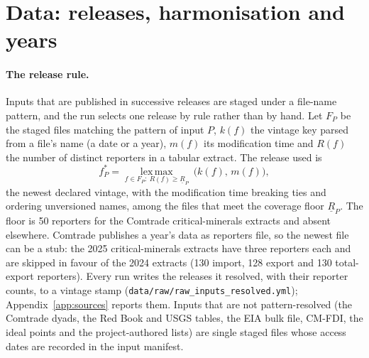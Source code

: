 \section{Data: releases, harmonisation and years}\label{oa:data}

\paragraph{The release rule.} Inputs that are published in successive releases are staged under
a file-name pattern, and the run selects one release by rule rather than by hand. Let $F_P$ be the
staged files matching the pattern of input $P$, $k(f)$ the vintage key parsed from a file's name
(a date or a year), $m(f)$ its modification time and $R(f)$ the number of distinct reporters in a
tabular extract. The release used is
\begin{equation}\label{eq:data_resolve}
  f^{*}_{P}=\operatorname*{lex\,max}_{f\in F_P:\ R(f)\ge\underline R_P}\ \bigl(k(f),\,m(f)\bigr),
\end{equation}
the newest declared vintage, with the modification time breaking ties and ordering unversioned
names, among the files that meet the coverage floor $\underline R_P$. The floor is 50 reporters for
the Comtrade critical-minerals extracts and absent elsewhere. Comtrade publishes a year's data as
reporters file, so the newest file can be a stub: the 2025 critical-minerals extracts have three
reporters each and are skipped in favour of the 2024 extracts (130 import, 128 export and 130
total-export reporters). Every run writes the releases it resolved, with their reporter counts, to
a vintage stamp (\texttt{data/raw/raw\_inputs\_resolved.yml}); Appendix~\ref{app:sources} reports
them. Inputs that are not pattern-resolved (the Comtrade dyads, the Red Book and USGS tables, the
EIA bulk file, CM-FDI, the ideal points and the project-authored lists) are single staged files
whose access dates are recorded in the input manifest.

